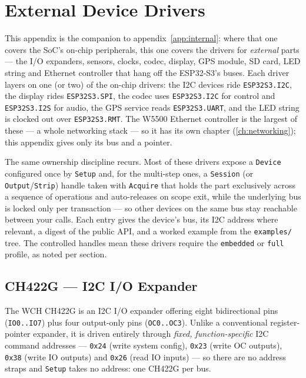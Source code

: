 \chapter{External Device Drivers}
\label{app:external}

This appendix is the companion to appendix~\ref{app:internal}: where that one
covers the SoC's on-chip peripherals, this one covers the drivers for
\emph{external} parts --- the I/O expanders, sensors, clocks, codec, display,
GPS module, SD card, LED string and Ethernet controller that hang off the
ESP32-S3's buses. Each driver layers on one (or two) of the on-chip drivers: the
I2C devices ride \texttt{ESP32S3.I2C}, the display rides \texttt{ESP32S3.SPI}, the
codec uses \texttt{ESP32S3.I2C} for control and \texttt{ESP32S3.I2S} for audio, the
GPS service reads \texttt{ESP32S3.UART}, and the LED string is clocked out over
\texttt{ESP32S3.RMT}. The W5500 Ethernet controller is the largest of these --- a
whole networking stack --- so it has its own chapter
(\ref{ch:networking}); this appendix gives only its bus and a pointer.

The same ownership discipline recurs. Most of these drivers expose a
\texttt{Device} configured once by \texttt{Setup} and, for the multi-step ones, a
\texttt{Session} (or \texttt{Output}/\texttt{Strip}) handle taken with
\texttt{Acquire} that holds the part exclusively across a sequence of operations
and auto-releases on scope exit, while the underlying bus is locked only per
transaction --- so other devices on the same bus stay reachable between your
calls. Each entry gives the device's bus, its I2C address where relevant, a digest
of the public API, and a worked example from the \texttt{examples/} tree. The
controlled handles mean these drivers require the \texttt{embedded} or
\texttt{full} profile, as noted per section.

\section{CH422G --- I2C I/O Expander}
\label{app:ext:ch422g}

The WCH CH422G is an I2C I/O expander offering eight bidirectional pins
(\texttt{IO0..IO7}) plus four output-only pins (\texttt{OC0..OC3}). Unlike a
conventional register-pointer expander, it is driven entirely through \emph{fixed,
function-specific} I2C command addresses --- \texttt{0x24} (write system config),
\texttt{0x23} (write OC outputs), \texttt{0x38} (write IO outputs) and \texttt{0x26}
(read IO inputs) --- so there are no address straps and \texttt{Setup} takes no
address: one CH422G per bus.

